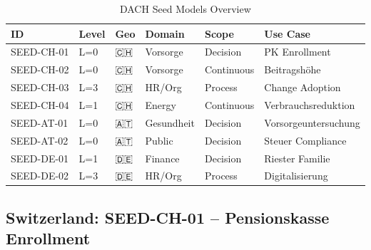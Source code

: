 \begin{table}[htbp]
\centering
\caption{DACH Seed Models Overview}
\label{tab:fff-seed-overview}
\renewcommand{\arraystretch}{1.2}
\small
\begin{tabular}{@{}llllll@{}}
\toprule
\textbf{ID} & \textbf{Level} & \textbf{Geo} & \textbf{Domain} & \textbf{Scope} & \textbf{Use Case} \\
\midrule
SEED-CH-01 & L=0 & 🇨🇭 & Vorsorge & Decision & PK Enrollment \\
SEED-CH-02 & L=0 & 🇨🇭 & Vorsorge & Continuous & Beitragshöhe \\
SEED-CH-03 & L=3 & 🇨🇭 & HR/Org & Process & Change Adoption \\
SEED-CH-04 & L=1 & 🇨🇭 & Energy & Continuous & Verbrauchsreduktion \\
\addlinespace
SEED-AT-01 & L=0 & 🇦🇹 & Gesundheit & Decision & Vorsorgeuntersuchung \\
SEED-AT-02 & L=0 & 🇦🇹 & Public & Decision & Steuer Compliance \\
\addlinespace
SEED-DE-01 & L=1 & 🇩🇪 & Finance & Decision & Riester Familie \\
SEED-DE-02 & L=3 & 🇩🇪 & HR/Org & Process & Digitalisierung \\
\bottomrule
\end{tabular}
\end{table}

\subsection{Switzerland: SEED-CH-01 -- Pensionskasse Enrollment}

